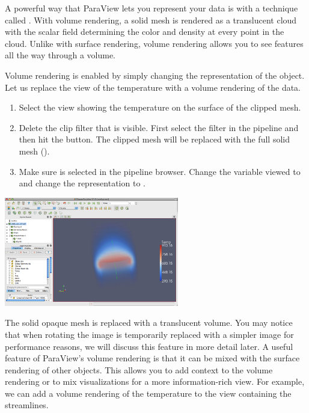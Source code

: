 A powerful way that ParaView lets you represent your data is with a
technique called .  With volume rendering, a
solid mesh is rendered as a translucent cloud with the scalar field
determining the color and density at every point in the cloud.  Unlike with
surface rendering, volume rendering allows you to see features all the way
through a volume.

Volume rendering is enabled by simply changing the representation of the
object.  Let us replace the view of the temperature with a volume rendering
of the data.

\begin{enumerate}
\item Select the view showing the temperature on the surface of the clipped
  mesh.
\item Delete the clip filter that is visible.  First select the filter in
  the pipeline and then hit the \delete button.  The clipped mesh will be
  replaced with the full solid mesh ().
\item Make sure  is selected in the pipeline
  browser.  Change the variable viewed to  and change the
  representation to .
\end{enumerate}

\begin{inlinefig}
  \includegraphics[width=3in]{images/VolumeRender1}
\end{inlinefig}

The solid opaque mesh is replaced with a translucent volume. You may notice
that when rotating the image is temporarily replaced with a simpler image
for performance reasons, we will discuss this feature in more detail later.
A useful feature of ParaView’s volume rendering is that it can be mixed
with the surface rendering of other objects.  This allows you to add
context to the volume rendering or to mix visualizations for a more
information-rich view.  For example, we can add a volume rendering of the
temperature to the view containing the streamlines.

